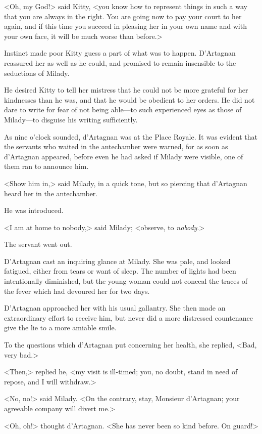 <Oh, my God!> said Kitty, <you know how to represent things in such a way that you are always in the right. You are going now to pay your court to her again, and if this time you succeed in pleasing her in your own name and with your own face, it will be much worse than before.> 

Instinct made poor Kitty guess a part of what was to happen. D'Artagnan reassured her as well as he could, and promised to remain insensible to the seductions of Milady. 

He desired Kitty to tell her mistress that he could not be more grateful for her kindnesses than he was, and that he would be obedient to her orders. He did not dare to write for fear of not being able---to such experienced eyes as those of Milady---to disguise his writing sufficiently. 

As nine o'clock sounded, d'Artagnan was at the Place Royale. It was evident that the servants who waited in the antechamber were warned, for as soon as d'Artagnan appeared, before even he had asked if Milady were visible, one of them ran to announce him. 

<Show him in,> said Milady, in a quick tone, but so piercing that d'Artagnan heard her in the antechamber. 

He was introduced. 

<I am at home to nobody,> said Milady; <observe, to \textit{nobody}.> 

The servant went out. 

D'Artagnan cast an inquiring glance at Milady. She was pale, and looked fatigued, either from tears or want of sleep. The number of lights had been intentionally diminished, but the young woman could not conceal the traces of the fever which had devoured her for two days. 

D'Artagnan approached her with his usual gallantry. She then made an extraordinary effort to receive him, but never did a more distressed countenance give the lie to a more amiable smile. 

To the questions which d'Artagnan put concerning her health, she replied, <Bad, very bad.> 

<Then,> replied he, <my visit is ill-timed; you, no doubt, stand in need of repose, and I will withdraw.> 

<No, no!> said Milady. <On the contrary, stay, Monsieur d'Artagnan; your agreeable company will divert me.> 

<Oh, oh!> thought d'Artagnan. <She has never been so kind before. On guard!> 

